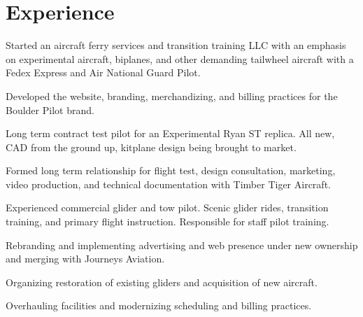 \documentclass[]{mershon-two-column-resume}
\begin{document}
\begin{minipage}[t]{0.33\textwidth}
		\sectionsep
				
		
	\end{minipage} 
	\hfill
	\begin{minipage}[t]{0.66\textwidth} 
		
		
		\section{Experience}
		
		\vspace{\topsep} %
		\begin{tightemize}
			\item Started an aircraft ferry services and transition training LLC with an emphasis on experimental aircraft, biplanes, and other demanding tailwheel aircraft with a Fedex Express and Air National Guard Pilot.
			\item Developed the website, branding, merchandizing, and billing practices for the Boulder Pilot brand.
			\item Long term contract test pilot for an Experimental Ryan ST replica. All new, CAD from the ground up, kitplane design being brought to market.
			\item Formed long term relationship for flight test, design consultation, marketing, video production, and technical documentation with Timber Tiger Aircraft.
		\end{tightemize}
		\sectionsep
		
		\begin{tightemize}
			\item Experienced commercial glider and tow pilot. Scenic glider rides, transition training, and primary flight instruction. Responsible for staff pilot training.
			\item Rebranding and implementing advertising and web presence under new ownership and merging with Journeys Aviation.
			\item Organizing restoration of existing gliders and acquisition of new aircraft.
			\item Overhauling facilities and modernizing scheduling and billing practices.
		\end{tightemize}
		\sectionsep
		

\end{minipage}
\end{document}
